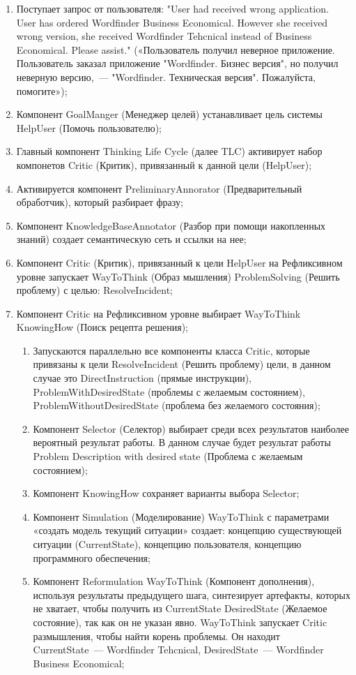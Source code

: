  \begin{enumerate}
	\item Поступает запрос от пользователя: 
	"User had received wrong application. User has ordered Wordfinder Business Economical. However she received wrong version, she received Wordfinder Tehcnical instead of Business Economical. Please assist." («Пользователь получил неверное приложение. Пользователь заказал приложение "Wordfinder. Бизнес версия", но получил неверную версию,~--- "Wordfinder. Техническая версия". Пожалуйста, помогите»);
	\item Компонент GoalManger (Менеджер целей) устанавливает цель системы HelpUser (Помочь пользователю);
	\item Главный компонент Thinking Life Cycle (далее TLC) активирует набор компонетов Critic (Критик), привязанный к данной цели (HelpUser); 
	\item Активируется компонент PreliminaryAnnorator (Предварительный обработчик), который разбирает фразу;
	\item Компонент KnowledgeBaseAnnotator (Разбор при помощи накопленных знаний) создает семантическую сеть и ссылки на нее;
	\item Компонент Critic (Критик), привязанный к цели HelpUser на Рефликсивном уровне запускает WayToThink (Образ мышления) ProblemSolving (Решить проблему) с целью: ResolveIncident;
	\item Компонент Critic на Рефликсивном уровне выбирает WayToThink KnowingHow (Поиск рецепта решения);
	\begin{enumerate}
	\item Запускаются параллельно все компоненты класса Critic, которые привязаны к цели ResolveIncident (Решить проблему) цели, в данном случае это DirectInstruction (прямые инструкции), ProblemWithDesiredState (проблемы с желаемым состоянием), ProblemWithoutDesiredState (проблема без желаемого состояния);
	\item Компонент Selector (Селектор) выбирает среди всех результатов наиболее вероятный результат работы. В данном случае будет результат работы Problem Description with desired state (Проблема с желаемым состоянием);
	\item Компонент KnowingHow сохраняет варианты выбора Selector;
	\item Компонент Simulation (Моделирование) WayToThink с параметрами «создать модель текущий ситуации» создает: концепцию существующей ситуации (CurrentState), концепцию пользователя, концепцию программного обеспечения;
	\item Компонент Reformulation WayToThink (Компонент дополнения), используя результаты предыдущего шага, синтезирует артефакты, которых не хватает, чтобы получить из CurrentState DesiredState (Желаемое состояние), так как он не указан явно. WayToThink запускает Critic размышления, чтобы найти корень проблемы. Он находит CurrentState~--- Wordfinder Tehcnical, DesiredState~--- Wordfinder Business Economical;

\end{enumerate}
\end{enumerate}
